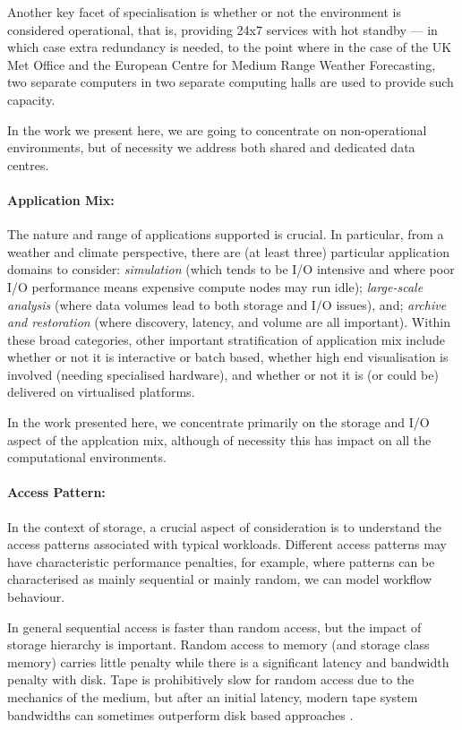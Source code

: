 Another key facet of specialisation is
whether or not the environment is considered operational, that is,
providing 24x7 services with hot standby --- in which case
extra redundancy is needed, to the point where in the case of the UK Met Office
and the European Centre for Medium Range Weather Forecasting, two separate
computers in two separate computing halls are used to provide such capacity.

In the work we present here, we are going to concentrate on non-operational
environments, but of necessity we address both shared and dedicated data centres.

\paragraph{Application Mix:}

The nature and range of applications supported is crucial. In particular,
from a weather and climate perspective, there are (at least three) particular
application domains to consider: \textit{simulation} (which tends to be I/O intensive
and where poor I/O performance means expensive compute nodes may run idle);
\textit{large-scale analysis} (where data volumes lead to both storage and I/O issues),
and; \textit{archive and restoration} (where discovery, latency, and volume are
all important). Within these broad categories, other important stratification
of application mix include whether or not it is interactive or batch based,
whether high end visualisation is involved (needing specialised hardware),
and whether or not it is (or could be) delivered on virtualised platforms.

In the work presented here, we concentrate primarily on the storage and I/O aspect
of the applcation mix, although of necessity this has impact on all the
computational environments.

\paragraph{Access Pattern:}
In the context of storage, a crucial aspect of consideration is to understand
the access patterns associated with typical workloads. Different access patterns
may have characteristic performance penalties, for example, where patterns can
be characterised as mainly sequential or mainly random, we can model workflow
behaviour.

In general sequential access is faster than random access, but the impact of
storage hierarchy is important. Random access to memory (and storage class
memory) carries little penalty while there is a significant latency and
bandwidth penalty with disk. Tape is prohibitively slow for random access due to
the mechanics of the medium, but after an initial latency, modern tape system
bandwidths can sometimes outperform  disk based approaches .

